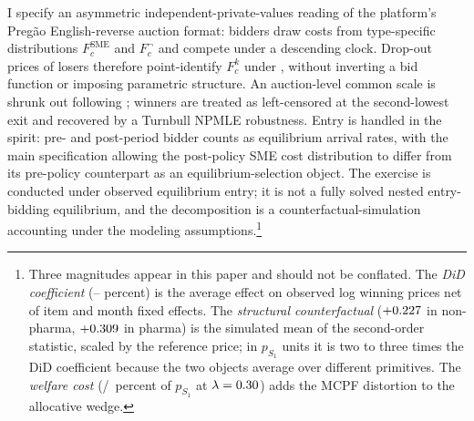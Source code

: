 I specify an asymmetric independent-private-values reading of the platform's Preg\~ao English-reverse auction format: bidders draw costs from type-specific distributions $F_c^{\text{SME}}$ and $F_c^{\neg}$ and compete under a descending clock. Drop-out prices of losers therefore point-identify $F_c^k$ under \citet{haile2003}, without inverting a bid function or imposing parametric structure. An auction-level common scale is shrunk out following \citet{krasnokutskaya2011}; winners are treated as left-censored at the second-lowest exit and recovered by a Turnbull NPMLE robustness. Entry is handled in the \citet{atheyseira2011} spirit: pre- and post-period bidder counts as equilibrium arrival rates, with the main specification allowing the post-policy SME cost distribution to differ from its pre-policy counterpart as an equilibrium-selection object. The exercise is conducted under observed equilibrium entry; it is not a fully solved nested entry-bidding equilibrium, and the decomposition is a counterfactual-simulation accounting under the modeling assumptions.\footnote{Three magnitudes appear in this paper and should not be conflated. The \emph{DiD coefficient} (\didLowerPct{}--\didUpperPct{} percent) is the average effect on observed log winning prices net of item and month fixed effects. The \emph{structural counterfactual} ($+0.227$ in non-pharma, $+0.309$ in pharma) is the simulated mean of the second-order statistic, scaled by the reference price; in $p_{S_1}$ units it is two to three times the DiD coefficient because the two objects average over different primitives. The \emph{welfare cost} (\welfLossPctLthirtyNp{}/\welfLossPctLthirtyPh{}~percent of $p_{S_1}$ at $\lambda = 0.30$) adds the MCPF distortion to the allocative wedge.}

